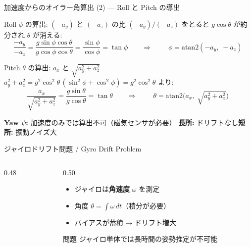 \begin{frame}{加速度からのオイラー角算出 (2) --- Roll と Pitch の導出}

  \begin{block}{Roll $\phi$ の算出: $(-a_y)$ と $(-a_z)$ の比}
    {\small
    $(-a_y)/(-a_z)$ をとると $g\cos\theta$ が約分され $\theta$ が消える:
    }
    \vspace{-0.5em}
    {\footnotesize
    \[
    \frac{-a_y}{-a_z}
    = \frac{g\sin\phi\cos\theta}{g\cos\phi\cos\theta}
    = \frac{\sin\phi}{\cos\phi}
    = \tan\phi
    \qquad\Longrightarrow\qquad
    \boxed{\;\phi = \mathrm{atan2}(-a_y,\; -a_z)\;}
    \]
    }
  \end{block}

  \vspace{-0.5em}

  \begin{block}{Pitch $\theta$ の算出: $a_x$ と $\sqrt{a_y^2 + a_z^2}$}
    {\small
    $a_y^2 + a_z^2 = g^2\cos^2\!\theta\,(\sin^2\!\phi + \cos^2\!\phi) = g^2\cos^2\!\theta$ より:
    }
    \vspace{-0.5em}
    {\footnotesize
    \[
    \frac{a_x}{\sqrt{a_y^2 + a_z^2}}
    = \frac{g\sin\theta}{g\cos\theta}
    = \tan\theta
    \qquad\Longrightarrow\qquad
    \boxed{\;\theta = \mathrm{atan2}\!\bigl(a_x,\;\sqrt{a_y^2 + a_z^2}\bigr)\;}
    \]
    }
  \end{block}

  \vspace{-0.3em}

  {\scriptsize
    \textbf{Yaw $\psi$:} 加速度のみでは算出不可（磁気センサが必要）\quad
    \textbf{長所:} ドリフトなし\quad \textbf{短所:} 振動ノイズ大
  }
\end{frame}

\begin{frame}{ジャイロドリフト問題 / Gyro Drift Problem}
  \begin{columns}[c]
    \begin{column}{0.48\textwidth}
      \centering
      \resizebox{\linewidth}{!}{}
    \end{column}
    \begin{column}{0.50\textwidth}
      \begin{itemize}
        \item ジャイロは\textbf{角速度} $\omega$ を測定
        \item 角度 $\theta = \int \omega\,dt$（積分が必要）
        \item バイアスが蓄積 → ドリフト増大
      \end{itemize}
      \vspace{0.5em}
      \begin{alertblock}{問題}
        ジャイロ単体では長時間の姿勢推定が不可能
      \end{alertblock}
    \end{column}
  \end{columns}
\end{frame}

